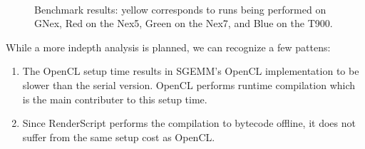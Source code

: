 \begin{figure}
    ~
    \\
    \caption{Benchmark results: yellow corresponds to runs being performed on GNex, Red on the Nex5, Green on the Nex7, and Blue on the T900.}%
    \label{fig:benchmarks}%
\end{figure}

While a more indepth analysis is planned, we can recognize a few pattens:

\begin{enumerate}
\item The OpenCL setup time results in SGEMM's OpenCL implementation to be slower than the serial version. OpenCL performs runtime compilation which is the main contributer to this setup time.
\item Since RenderScript performs the compilation to bytecode offline, it does not suffer from the same setup cost as OpenCL.
\end{enumerate}
